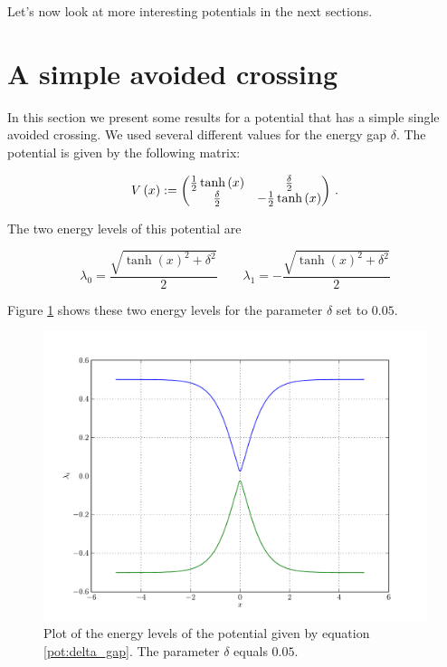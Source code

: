 Let's now look at more interesting potentials in the next sections.

\section{A simple avoided crossing}

In this section we present some results for a potential that has a simple single
avoided crossing. We used several different values for the energy gap $\delta$.
The potential is given by the following matrix:

\begin{equation} \label{pot:delta_gap}
  V\left( x \right) :=
  \begin{pmatrix}
    \frac{1}{2} \tanh\left( x \right) & \frac{\delta}{2} \\
    \frac{\delta}{2}         & -\frac{1}{2} \tanh\left( x \right)
  \end{pmatrix} \,.
\end{equation}

The two energy levels of this potential are

\begin{equation}
  \lambda_0 = \frac{\sqrt{{\tanh\left( x\right) }^{2}+{\delta}^{2}}}{2} \qquad
  \lambda_1 = -\frac{\sqrt{{\tanh\left(x\right) }^{2}+{\delta}^{2}}}{2}
\end{equation}

Figure \ref{fig:delta_gap} shows these two energy levels for the parameter $\delta$
set to $0.05$.

\begin{figure}
  \centering
  \includegraphics[width=0.8\linewidth]{./plot/delta_gap/potential_eigenvalues.pdf}
  \caption{Plot of the energy levels of the potential given by equation \eqref{pot:delta_gap}. The parameter $\delta$ equals $0.05$.}
  \label{fig:delta_gap}
\end{figure}


